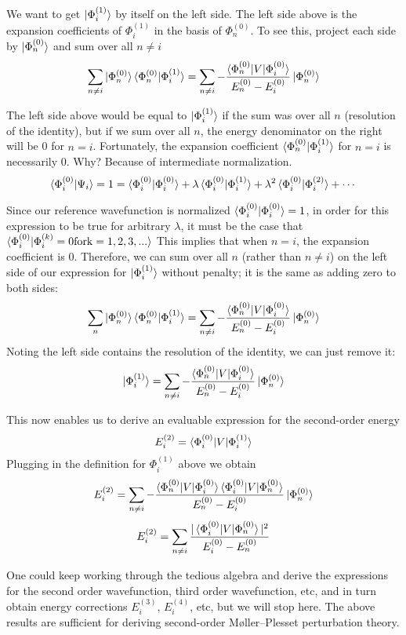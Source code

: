 \documentclass{article}
\newcommand{\lam}{\lambda}
\newcommand{\Ezero}{E^{(0)}}
\newcommand{\Phizero}{\Phi^{(0)}}
\newcommand{\Phione}{\Phi^{(1)}}
\begin{document}
We want to get $\ket{\Phione_i}$ by itself on the left side.
The left side above is the expansion coefficients of $ \Phione_i$ in the basis of $\Phizero_n$.
To see this, project each side by $ \ket{\Phizero_n} $ and sum over all $n \neq i$
\[ \sum_{n \neq i} \ket{ \Phizero_n} \braket{\Phizero_n | \Phione_i } = \sum_{n \neq i} -\frac{ \braket{ \Phizero_n | V | \Phizero_i} }{ \Ezero_n - \Ezero_i} \ket{\Phizero_n} \]

The left side above would be equal to $\ket{\Phione_i}$ if the sum was over all $n$ (resolution of the identity), 
    but if we sum over all $n$, the energy denominator on the right will be 0 for $n = i$. 
Fortunately, the expansion coefficient $\braket{\Phizero_n | \Phione_i } $ for $n = i$ is necessarily 0.
Why? Because of intermediate normalization.
\[\braket{\Phizero_i | \Psi_i} = 1 = \braket{\Phizero_i | \Phizero_i} + \lam \braket{\Phizero_i | \Phione_i} + \lam^2 \braket{\Phizero_i|\Phi_i^{(2)}} + \cdots \]

Since our reference wavefunction is normalized $\braket{\Phizero_i | \Phizero_i} = 1$, in order for this expression to be true for arbitrary $\lam$,
it must be the case that $\braket{\Phizero_i | \Phi_i^{(k)} = 0 \mathrm{for k} = 1,2,3,...}   $
This implies that when $n = i$, the expansion coefficient is 0.
Therefore, we can sum over all $n$ (rather than $n \neq i$) on the left side of our expression for $\ket{\Phione_i}$ without penalty; it is the same as adding zero to both sides:
\[ \sum_{n} \ket{ \Phizero_n} \braket{\Phizero_n | \Phione_i } = \sum_{n \neq i} -\frac{ \braket{ \Phizero_n | V | \Phizero_i} }{ \Ezero_n - \Ezero_i} \ket{\Phizero_n} \]
Noting the left side contains the resolution of the identity, we can just remove it:
\[ \ket{\Phione_i} = \sum_{n \neq i} -\frac{ \braket{ \Phizero_n | V | \Phizero_i} }{ \Ezero_n - \Ezero_i} \ket{\Phizero_n} \]

This now enables us to derive an evaluable expression for the second-order energy 
\[ E_i^{(2)} = \braket{\Phi_i^{(0)} | V | \Phi_i^{(1)}} \]
Plugging in the definition for $\Phi_i^{(1)}$ above we obtain
\[ E_i^{(2)} = \sum_{n \neq i} -\frac{ \braket{ \Phizero_n | V | \Phizero_i} \braket{ \Phizero_i | V | \Phizero_n} }{ \Ezero_n - \Ezero_i} \ket{\Phizero_n} \]
\[ E_i^{(2)} = \sum_{n \neq i} \frac{ |\braket{ \Phizero_i | V | \Phizero_n} |^2  }{ \Ezero_i - \Ezero_n} \]

One could keep working through the tedious algebra and derive the expressions for the second order wavefunction, third order wavefunction, etc, and
in turn obtain energy corrections $E_i^{(3)}$, $E_i^{(4)}$, etc, but we will stop here.
The above results are sufficient for deriving second-order M{\o}ller--Plesset perturbation theory.
\end{document}
